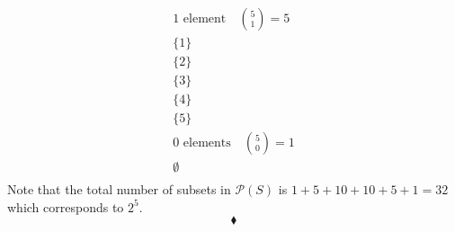 \begin{align*}
1\text{ element}\quad \binom{5}{1}= 5\\
\{1\}\\
\{2\}\\
\{3\}\\
\{4\}\\
\{5\}\\
0\text{ elements}\quad \binom{5}{0}= 1\\
\emptyset\\
\end{align*}
Note that the total number of subsets in $\mathscr{P}(S)$ is $1+5+10+10+5+1 = 32$ which corresponds to $2^5$.
$$\blacklozenge$$
\newpage